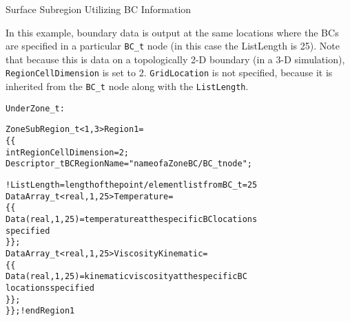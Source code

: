 \begin{example}{Surface Subregion Utilizing BC Information}
\label{ex:zonesubregion4}

In this example, boundary data is output at the same locations where the BCs
are specified in a particular \texttt{BC\_t} node (in this case the ListLength is 25).
Note that because this is data on a topologically 2-D boundary (in a 3-D simulation),
\texttt{RegionCellDimension} is set to 2. \texttt{GridLocation} is not specified,
because it is inherited from the \texttt{BC\_t} node along with the \texttt{ListLength}.

\begin{alltt}
Under Zone\_t:

  ZoneSubRegion\_t<1,3> Region1 =
    \{\{
    int RegionCellDimension = 2;
    Descriptor\_t BCRegionName = "name of a ZoneBC/BC\_t node" ;

    ! ListLength = length of the point/element list from BC\_t = 25
    DataArray\_t<real,1,25> Temperature =
      \{\{
      Data(real,1,25) = temperature at the specific BC locations 
                        specified
      \}\} ;
    DataArray\_t<real,1,25> ViscosityKinematic =
      \{\{
      Data(real,1,25) = kinematic viscosity at the specific BC 
                        locations specified
      \}\} ;
    \}\} ; ! end Region1
\end{alltt}

\end{example}

